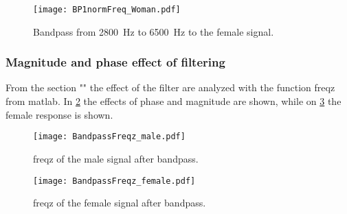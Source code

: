 \begin{figure}[h]
	\centering
	\texttt{[image: BP1normFreq\_Woman.pdf]}
	\caption{Bandpass from \SI{2800}{\hertz} to \SI{6500}{\hertz} to the female signal.}
	\label{fig:femaleBP}
\end{figure}

\subsubsection{Magnitude and phase effect of filtering}
From the section "" the effect of the filter are analyzed with the function freqz from matlab. In \cref{fig:freqzMaleBP} the effects of phase and magnitude are shown, while on \cref{fig:freqzFemaleBP} the female response is shown. 

\begin{figure}
\centering
\texttt{[image: BandpassFreqz\_male.pdf]}
\caption{freqz of the male signal after bandpass.}
\label{fig:freqzMaleBP}
\end{figure}

\begin{figure}
\centering
\texttt{[image: BandpassFreqz\_female.pdf]}
\caption{freqz of the female signal after bandpass.}
\label{fig:freqzFemaleBP}
\end{figure}